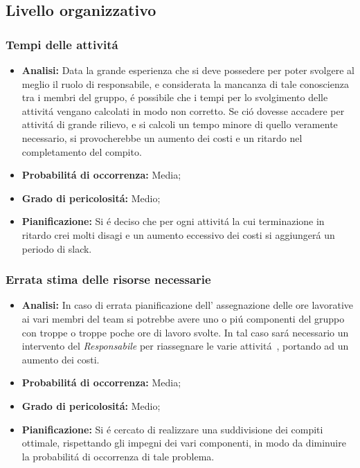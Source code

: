 \subsection{Livello organizzativo}
\subsubsection{Tempi delle attivit\'a}
	\begin{itemize}
	\item \textbf{Analisi: }Data la grande esperienza che si deve possedere per poter svolgere al meglio il ruolo di responsabile, e considerata la mancanza di tale conoscienza tra i membri del gruppo, \'e possibile che i tempi per lo svolgimento delle attivit\'a vengano calcolati in modo non corretto. Se ci\'o dovesse accadere per attivit\'a di grande rilievo, e si calcoli un tempo minore di quello veramente necessario, si provocherebbe un aumento dei costi e un ritardo nel completamento del compito.
	\item \textbf{Probabilit\'a di occorrenza:} Media;
	\item \textbf{Grado di pericolosit\'a:} Medio;
	\item \textbf{Pianificazione: }Si \'e deciso che per ogni attivit\'a la cui terminazione in ritardo crei molti disagi e un aumento eccessivo dei costi si aggiunger\'a un periodo di slack.
	\end{itemize}
\subsubsection{Errata stima delle risorse necessarie}
	\begin{itemize}
	\item \textbf{Analisi: }In caso di errata pianificazione dell' assegnazione delle ore lavorative ai vari membri del team si potrebbe avere uno o pi\'u componenti del gruppo con troppe o troppe poche ore di lavoro svolte. In tal caso sar\'a necessario un intervento del \textit{Responsabile} per riassegnare le varie attivit\'a~, portando ad un aumento dei costi.
	\item \textbf{Probabilit\'a di occorrenza:} Media;
	\item \textbf{Grado di pericolosit\'a:} Medio;
	\item \textbf{Pianificazione: }Si \'e cercato di realizzare una suddivisione dei compiti ottimale, rispettando gli impegni dei vari componenti, in modo da diminuire la probabilit\'a di occorrenza di tale problema.
	\end{itemize}
